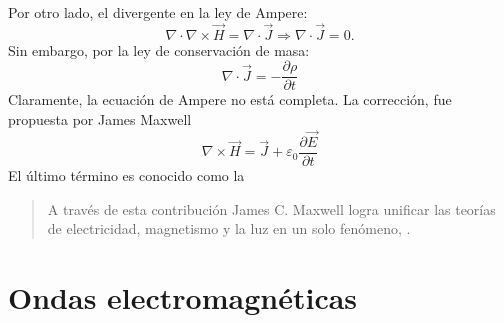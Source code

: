 \documentclass[letterpaper,10pt,english]{jupyterBook}
\begin{document}
\sphinxAtStartPar
Por otro lado, el divergente en la ley de Ampere:
\begin{equation*}
\nabla\cdot \nabla\times\vec{H} = \nabla\cdot\vec{J} \Rightarrow \nabla\cdot\vec{J} = 0.
\end{equation*}
\sphinxAtStartPar
Sin embargo, por la ley de conservación de masa:
\begin{equation*}
\nabla\cdot\vec{J} = - \frac{\partial \rho}{\partial t}
\end{equation*}
\sphinxAtStartPar
Claramente, la ecuación de Ampere no está completa. La corrección, fue propuesta por James Maxwell
\label{equation:1_ondas_electromagneticas/1_ondas_electromagneticas:f244fa1b-e6e4-4b00-a963-8eb807f1fb60}\begin{equation}
\nabla\times\vec{H} = \vec{J} + \varepsilon_0\frac{\partial\vec{E}}{\partial t}
\end{equation}
\sphinxAtStartPar
El último término es conocido como la 
\begin{quote}

\sphinxAtStartPar
A través de esta contribución James C. Maxwell logra unificar las teorías de electricidad, magnetismo y la luz en un solo fenómeno, .
\end{quote}


\section{Ondas electromagnéticas}
\label{\detokenize{1_ondas_electromagneticas/1_ondas_electromagneticas:ondas-electromagneticas}}
\end{document}
